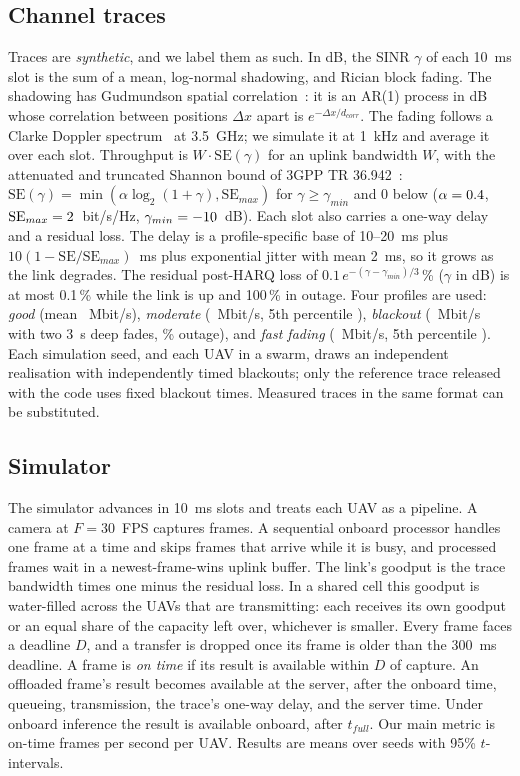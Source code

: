 \documentclass[journal,twocolumn,10pt]{IEEEtran}
\begin{document}
\subsection{Channel traces}
Traces are \emph{synthetic}, and we label them as such. In dB, the SINR $\gamma$ of each 10~ms slot is the sum of a mean, log-normal shadowing, and Rician block fading. The shadowing has Gudmundson spatial correlation~\cite{gudmundson1991correlation}: it is an AR(1) process in dB whose correlation between positions $\Delta x$ apart is $e^{-\Delta x/d_{corr}}$. The fading follows a Clarke Doppler spectrum~\cite{clarke1968statistical} at 3.5~GHz; we simulate it at 1~kHz and average it over each slot. Throughput is $W\cdot\mathrm{SE}(\gamma)$ for an uplink bandwidth $W$, with the attenuated and truncated Shannon bound of 3GPP TR 36.942~\cite{3gpp36942}: $\mathrm{SE}(\gamma)=\min(\alpha\log_2(1+\gamma),\mathrm{SE}_{max})$ for $\gamma\ge\gamma_{min}$ and 0 below ($\alpha=0.4$, $\mathrm{SE}_{max}=2$~bit/s/Hz, $\gamma_{min}=-10$~dB). Each slot also carries a one-way delay and a residual loss. The delay is a profile-specific base of 10--20~ms plus $10(1-\mathrm{SE}/\mathrm{SE}_{max})$~ms plus exponential jitter with mean 2~ms, so it grows as the link degrades. The residual post-HARQ loss of $0.1\,e^{-(\gamma-\gamma_{min})/3}$\,\% ($\gamma$ in dB) is at most 0.1\,\% while the link is up and 100\,\% in outage. Four profiles are used: \emph{good} (mean \TraceGoodMeanMbps~Mbit/s), \emph{moderate} (\TraceModerateMeanMbps~Mbit/s, 5th percentile \TraceModeratePFiveMbps), \emph{blackout} (\TraceBlackoutMeanMbps~Mbit/s with two 3~s deep fades, \TraceBlackoutOutagePct\% outage), and \emph{fast fading} (\TraceFadingMeanMbps~Mbit/s, 5th percentile \TraceFadingPFiveMbps). Each simulation seed, and each UAV in a swarm, draws an independent realisation with independently timed blackouts; only the reference trace released with the code uses fixed blackout times. Measured traces in the same format can be substituted.

\subsection{Simulator}
The simulator advances in 10~ms slots and treats each UAV as a pipeline. A camera at $F=30$~FPS captures frames. A sequential onboard processor handles one frame at a time and skips frames that arrive while it is busy, and processed frames wait in a newest-frame-wins uplink buffer. The link's goodput is the trace bandwidth times one minus the residual loss. In a shared cell this goodput is water-filled across the UAVs that are transmitting: each receives its own goodput or an equal share of the capacity left over, whichever is smaller. Every frame faces a deadline $D$, and a transfer is dropped once its frame is older than the 300~ms deadline. A frame is \emph{on time} if its result is available within $D$ of capture. An offloaded frame's result becomes available at the server, after the onboard time, queueing, transmission, the trace's one-way delay, and the server time. Under onboard inference the result is available onboard, after $t_{full}$. Our main metric is on-time frames per second per UAV. Results are means over \NumSeeds{} seeds with 95\% $t$-intervals.
\end{document}
